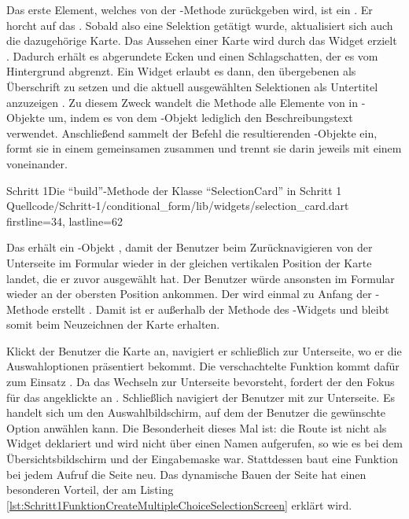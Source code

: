 Das erste Element, welches von der -Methode zurückgeben wird, ist ein  .
Er horcht auf das  .
Sobald also eine Selektion getätigt wurde, aktualisiert sich auch die dazugehörige Karte.
Das Aussehen einer Karte wird durch das Widget  erzielt .
Dadurch erhält es abgerundete Ecken und einen Schlagschatten, der es vom Hintergrund abgrenzt.
Ein  Widget erlaubt es dann, den übergebenen  als Überschrift zu setzen  und die aktuell ausgewählten Selektionen als Untertitel anzuzeigen .
Zu diesem Zweck wandelt die Methode  alle Elemente von  in -Objekte um, indem es von dem -Objekt lediglich den Beschreibungstext  verwendet.
Anschließend sammelt der Befehl  die resultierenden -Objekte ein, formt sie in einem gemeinsamen  zusammen und trennt sie darin jeweils mit einem  voneinander.

\begin{alexlisting}{Schritt 1}{Die \enquote{build}-Methode der Klasse \enquote{SelectionCard} in Schritt 1}
  {Quellcode/Schritt-1/conditional_form/lib/widgets/selection_card.dart}
  {firstline=34, lastline=62}
  \label{lst:Schritt1BuildMethodeDerSelectionCard}
\end{alexlisting}

Das  erhält ein -Objekt , damit der Benutzer beim Zurücknavigieren von der Unterseite im Formular wieder in der gleichen vertikalen Position der Karte landet, die er zuvor ausgewählt hat.
Der Benutzer würde ansonsten im Formular wieder an der obersten Position ankommen.
Der  wird einmal zu Anfang der -Methode erstellt .
Damit ist er außerhalb der Methode  des -Widgets und bleibt somit beim Neuzeichnen der Karte erhalten.


Klickt der Benutzer die Karte an, navigiert er schließlich zur Unterseite, wo er die Auswahloptionen präsentiert bekommt.
Die verschachtelte Funktion  kommt dafür zum Einsatz .
Da das Wechseln zur Unterseite bevorsteht, fordert der  den Fokus für das angeklickte  an .
Schließlich navigiert der Benutzer mit  zur Unterseite. Es handelt sich um den Auswahlbildschirm, auf dem der Benutzer die gewünschte Option anwählen kann. Die Besonderheit dieses Mal ist: die Route ist nicht als Widget deklariert und wird nicht über einen Namen aufgerufen, so wie es bei dem Übersichtsbildschirm und der Eingabemaske war. Stattdessen baut eine Funktion bei jedem Aufruf die Seite neu. Das dynamische Bauen der Seite hat einen besonderen Vorteil, der am Listing \ref{lst:Schritt1FunktionCreateMultipleChoiceSelectionScreen} erklärt wird.







